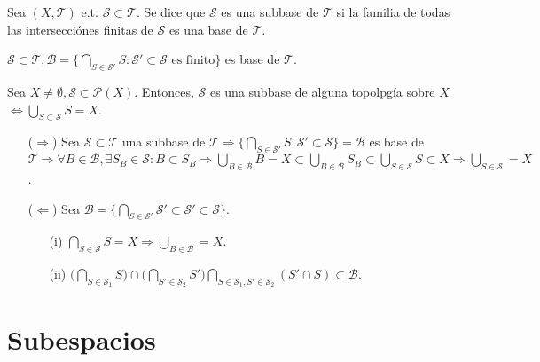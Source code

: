 \begin{defn}[Subbase]
  Sea $( X, \mathcal{T} )$ e.t. $\mathcal{S} \subset \mathcal{T}$. Se dice que $\mathcal{S}$ es una subbase de $\mathcal{T}$ si la familia de todas las intersecciónes finitas de $\mathcal{S}$ es una base de $\mathcal{T}$.
\end{defn}

\begin{obs}
  $\mathcal{S} \subset \mathcal{T}, \mathcal{B} = \{ \bigcap_{S \in \mathcal{S}'} S : \mathcal{S}' \subset \mathcal{S} \text{ es finito} \}$ es base de $\mathcal{T}$.
\end{obs}

\begin{prop}
  Sea $X \neq \emptyset, \mathcal{S} \subset \mathcal{P}(X)$. Entonces, $\mathcal{S}$ es una subbase de alguna topolpgía sobre $X$ $\Leftrightarrow \bigcup_{S \subset \mathcal{S}} S = X$.
\end{prop}

\begin{dem}
  \begin{enumerate}[label=(\roman*)]
    \item [($\Rightarrow$)] Sea $\mathcal{S} \subset \mathcal{T}$ una subbase de $\mathcal{T} \Rightarrow \{ \bigcap_{S \in \mathcal{S}' } S : \mathcal{S}' \subset \mathcal{S}  \} = \mathcal{B}$ es base de $\mathcal{T} \Rightarrow \forall B \in \mathcal{B}, \exists S_{B} \in \mathcal{S}: B \subset S_{B} \Rightarrow \bigcup_{B \in \mathcal{B}}B = X \subset \bigcup_{B \in \mathcal{B}} S_{B} \subset \bigcup_{S \in \mathcal{S}} S \subset X \Rightarrow \bigcup_{S \in \mathcal{S}}= X$.
    \item [($\Leftarrow$)] Sea $\mathcal{B} = \{ \bigcap_{S \in \mathcal{S}'} \mathcal{S}' \subset \mathcal{S}' \subset \mathcal{S} \}$.
      \begin{enumerate}[label=(\roman*)]
        \item [(i)] $ \bigcap_{S \in \mathcal{S}} S = X \Rightarrow \bigcup_{B \in \mathcal{B}} = X$.
        \item [(ii)] $\big (  \bigcap_{S \in \mathcal{S}_{1}} S \big ) \cap \big (  \bigcap_{S' \in \mathcal{S}_{2}} S'  \big )  \bigcap_{S \in \mathcal{S}_{1}, S' \in \mathcal{S}_{2}} (S'\cap S) \subset \mathcal{B}$.
      \end{enumerate}
  \end{enumerate}
\end{dem}

\section{Subespacios}

